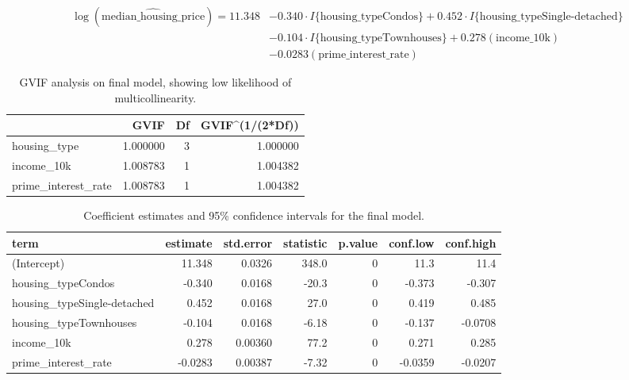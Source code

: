 \documentclass[10pt]{article}
\begin{document}
\begin{equation*}
    \begin{aligned}
        \log(\widehat{\text{median\_housing\_price}}) = 11.348 &- 0.340 \cdot I\{\text{housing\_typeCondos}\} + 0.452 \cdot I\{\text{housing\_typeSingle-detached}\} \\
        &- 0.104 \cdot I\{\text{housing\_typeTownhouses}\} + 0.278(\text{income\_10k}) \\
        &- 0.0283(\text{prime\_interest\_rate})
    \end{aligned}
\end{equation*}

\begin{table}[H]
    \centering
    \small
    \begin{tabular}{lrrr}
        \toprule
        & GVIF & Df & GVIF\textasciicircum{}(1/(2*Df)) \\
        \midrule
        housing\_type & 1.000000 & 3 & 1.000000 \\
        income\_10k & 1.008783 & 1 & 1.004382 \\
        prime\_interest\_rate & 1.008783 & 1 & 1.004382 \\
        \bottomrule
    \end{tabular}
    \caption{GVIF analysis on final model, showing low likelihood of multicollinearity.}
\end{table}

\begin{table}[H]
    \centering
    \small
    \begin{tabular}{lrrrrrr}
        \toprule
        term & estimate & std.error & statistic & p.value & conf.low & conf.high \\
        \midrule
        (Intercept) & 11.348 & 0.0326 & 348.0 & 0 & 11.3 & 11.4 \\
        housing\_typeCondos & -0.340 & 0.0168 & -20.3 & 0 & -0.373 & -0.307 \\
        housing\_typeSingle-detached & 0.452 & 0.0168 & 27.0 & 0 & 0.419 & 0.485 \\
        housing\_typeTownhouses & -0.104 & 0.0168 & -6.18 & 0 & -0.137 & -0.0708 \\
        income\_10k & 0.278 & 0.00360 & 77.2 & 0 & 0.271 & 0.285 \\
        prime\_interest\_rate & -0.0283 & 0.00387 & -7.32 & 0 & -0.0359 & -0.0207 \\
        \bottomrule
    \end{tabular}
    \caption{Coefficient estimates and 95\% confidence intervals for the final model.}
\end{table}
\end{document}
